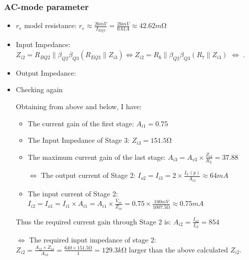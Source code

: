 \documentclass[twoside, a4paper, leqno]{article}
\begin{document}
		\subsubsection*{AC-mode parameter}
		\begin{itemize}
			\item $r_e$ model resistance: $r_e \approx \frac{26mV}{I_{EQ3}} = \frac{26mV}{0.61A} \approx 42.62m\si{\ohm}$
		
			\item Input Impedance: $Z_{i2} = R_{BQ2}\parallel \beta_{Q2}\beta_{Q3}(R_{EQ3}\parallel Z_{i3}) \Leftrightarrow Z_{i2} = R_6\parallel \beta_{Q2}\beta_{Q3}(R_7\parallel Z_{i3})$ $\Leftrightarrow$ .
		
			\item Output Impedance: 
		
			\item Checking again
			
			Obtaining from above and below, I have:
			\begin{itemize}
				\item The current gain of the first stage: $A_{i1} = 0.75$
				
				\item The Input Impedance of Stage 3: $Z_{i3} = 151.5\si{\ohm}$
				\item The maximum current gain of the last stage: $A_{i3} = A_{v3}\times \frac{Z_{i3}}{R_L} = 37.88$
				
				$\Leftrightarrow$ The output current of Stage 2: $I_{o2} = I_{i3} = 2 \times \frac{I_L(p)}{A_{i3}} \approx 64mA$
				
				\item The input current of Stage 2: $I_{i2} = I_{o1} = I_{i1}\times A_{i1} = A_{i1} \times \frac{V_{in}}{Z_{in}} = 0.75 \times\frac{100mV}{1007.5\si{\ohm}} \approx 0.75mA$	
			\end{itemize}
			Thus the required current gain through Stage 2 is: $A_{i2} = \frac{I_{o2}}{I_{i2}} = 854$
			
			$\Leftrightarrow$ The required input impedance of stage 2: $Z_{i2} = \frac{A_{i2}\times Z_{i3}}{A_{v2}} = \frac{640\times 151.5\si{\ohm}}{1} = 129.3k\si{\ohm}$ larger than the above calculated $Z_{i2}$.
			
		\end{itemize}
		
\end{document}
